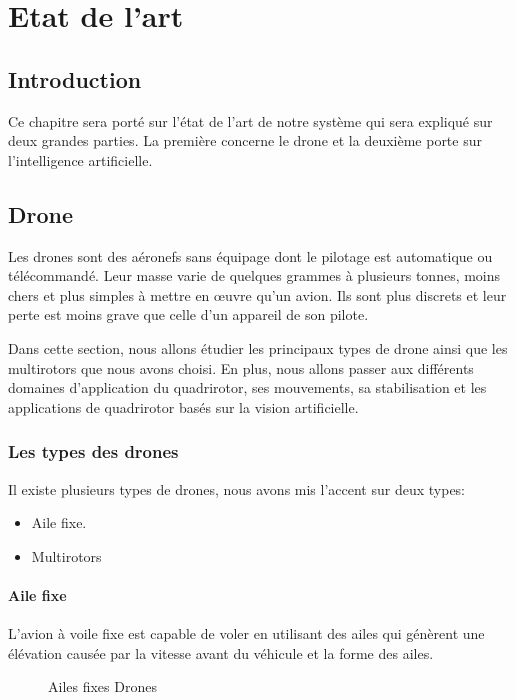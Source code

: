 	
\chapter{Etat de l'art }
\newpage	
\section*{Introduction}
Ce chapitre sera porté sur l'état de l'art de notre système qui sera expliqué sur deux grandes parties. La première concerne le drone et la deuxième porte sur l'intelligence artificielle. 
\section{Drone}	
Les drones sont des aéronefs sans équipage dont le pilotage est automatique ou télécommandé. Leur masse varie de quelques grammes à plusieurs tonnes\cite{Wikipideaa}, moins chers et plus simples à mettre en œuvre qu'un avion. Ils sont plus discrets et leur perte est moins grave que celle d'un appareil de son pilote.

Dans cette section, nous allons étudier les principaux types de drone ainsi que les multirotors que nous avons choisi. En plus, nous allons passer aux différents domaines d'application du quadrirotor, ses mouvements, sa stabilisation et les applications de quadrirotor basés sur la vision artificielle.   	
\subsection{Les types des drones}
Il existe plusieurs types de drones, nous avons mis l'accent sur deux types:
	\begin{itemize}
	 \item Aile fixe.
	 \item Multirotors 
	\end{itemize}
	\subsubsection{Aile fixe }
	L'avion à voile fixe est capable de voler en utilisant des ailes qui génèrent une élévation causée par la vitesse avant du véhicule et la forme des ailes\cite{educalingo}.
	
	
	\begin{figure}[H] 
	\begin{center} 
		\centering

		
	\end{center}
	
	\caption{Ailes fixes Drones}
	\end{figure}
